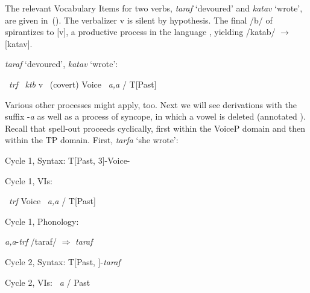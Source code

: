 \begin{exe}
\begin{xlist}
\begin{exe}
\begin{xlist}
\begin{exe}
\begin{xlist}
\begin{exe}
\begin{exe}
\begin{xlist}
\begin{exe}
\begin{xlist}
\begin{exe}
\begin{xlist}
\begin{exe}
\begin{xlist}
\begin{exe}
\begin{xlist}
\begin{exe}
\begin{xlist}
\begin{exe}
\begin{xlist}
\begin{exe}
\begin{xlist}
\begin{exe}
\begin{xlist}
\begin{exe}
\begin{xlist}
\begin{exe}
\begin{xlist}
\begin{exe}
\begin{xlist}
\begin{exe}
\begin{exe}
\begin{xlist}
\begin{exe}
\begin{xlist}
\begin{exe}
\begin{xlist}
\begin{exe}
\begin{xlist}
{\begin{exe}
\begin{xlist}
\begin{exe}
\begin{xlist}
 \z
\z 

The relevant Vocabulary Items for two verbs, \emph{taraf} `devoured' and \emph{katav} `wrote', are given in~(\nextx). The verbalizer v is silent by hypothesis. The final /b/ of  spirantizes to [v], a productive process in the language \citep{temkinmartinzemuellner16,kastner17gjgl,kastner18nllt}, yielding /katab/ $\rightarrow$ [katav].
 \begin{exe}
 \ex  \emph{taraf} `devoured', \emph{katav} `wrote': 
 \begin{xlist} 
 	\ex   {} \lra~\emph{trf} 
 	\ex   {} \lra~\emph{ktb} 
 	\ex   v \lra~(covert) 
 	\ex   Voice \lra~\emph{a,a} / T[Past] \trace 
 \z
\z 

Various other processes might apply, too. Next we will see derivations with the  suffix -\emph{a} as well as a process of syncope, in which a vowel is deleted (annotated ). Recall that spell-out proceeds cyclically, first within the VoiceP domain and then within the TP domain. First, \emph{tarfa} `she wrote':
 \begin{exe}
\ex   Cycle 1, Syntax: 
	 T[Past, 3]-Voice-

 \ex  Cycle 1, VIs: 
 \begin{xlist} 
 	\ex   {} \lra~\emph{trf} 
 	\ex   Voice \lra~\emph{a,a} / T[Past] \trace 
 \z

 \ex  Cycle 1, Phonology: 
 \begin{xlist} 
 	\ex   \emph{a,a}-\emph{trf} 
 	\ex   /taraf/ $\Rightarrow$ \emph{taraf} 
 \z

\ex  Cycle 2, Syntax: 
	T[Past, ]-\emph{taraf}

\ex   Cycle 2, VIs: 
	 \lra~\emph{a} / Past \trace


\end{xlist}
\end{xlist}
\end{exe}
\end{xlist}
\end{exe}
\end{xlist}
\end{exe}
\end{xlist}
\end{exe}}
\end{xlist}
\end{exe}
\end{xlist}
\end{exe}
\end{xlist}
\end{exe}
\end{xlist}
\end{exe}
\end{exe}
\end{xlist}
\end{exe}
\end{xlist}
\end{exe}
\end{xlist}
\end{exe}
\end{xlist}
\end{exe}
\end{xlist}
\end{exe}
\end{xlist}
\end{exe}
\end{xlist}
\end{exe}
\end{xlist}
\end{exe}
\end{xlist}
\end{exe}
\end{xlist}
\end{exe}
\end{xlist}
\end{exe}
\end{xlist}
\end{exe}
\end{exe}
\end{xlist}
\end{exe}
\end{xlist}
\end{exe}
\end{xlist}
\end{exe}

